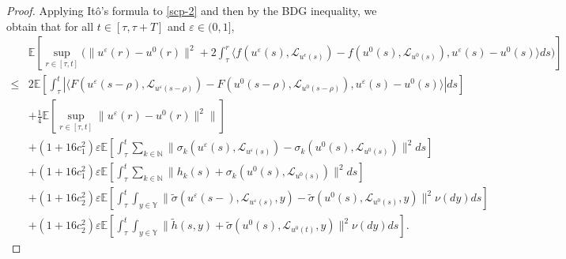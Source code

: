 \documentclass[11pt]{article}
\numberwithin{equation}{section}
\theoremstyle{plain}
\begin{document}
\begin{proof}
  Applying It\^o's formula to \eqref{scp-2} and then by the BDG inequality, we obtain that for all $t \in [\tau, \tau+T]$ and $\varepsilon \in (0,1]$,
  \begin{align}\label{scp-3}
         & \mathbb{E}
              \left[ \sup_{r \in [\tau, t]}
                        \bigg( \| u^\varepsilon(r) - u^0(r) \|^2 
                              +2 \int_{\tau}^{r}
                                   \langle f(u^\varepsilon(s), \mathcal{L}_{u^\epsilon(s)}) - f(u^{0}(s), \mathcal{L}_{u^{0}(s)}),
                                           u^\varepsilon(s) - u^{0}(s)
                                   \rangle ds
                        \bigg)
              \right]  \nonumber\\
   \le & 2 \mathbb{E}
               \left[ \int_{\tau}^{t}
                      \left| \langle F( u^\varepsilon(s-\rho), \mathcal{L}_{u^\varepsilon(s-\rho)}) - F( u^{0}(s-\rho), \mathcal{L}_{u^{0}(s-\rho)}),
                                     u^\varepsilon(s) - u^{0}(s)
                             \rangle
                       \right| ds
               \right]  \nonumber\\
        & + \frac{1}{4} \mathbb{E} \left[ \sup_{r \in [\tau, t]} \| u^\varepsilon(r) - u^0(r) \|^2 \| \right]  \nonumber\\
        & + (1+16c_1^2)\varepsilon \mathbb{E}
            \left[ \int_{\tau}^{t}
                      \sum_{k \in \mathbb{N} }
                            \|\sigma_k(u^\varepsilon(s), \mathcal{L}_{u^\varepsilon(s)}) - \sigma_k(u^{0}(s), \mathcal{L}_{u^{0}(s)}) \|^2 ds
            \right]  \nonumber\\
        & + (1+16c_1^2) \varepsilon \mathbb{E}
            \left[ \int_{\tau}^{t}
                      \sum_{k \in \mathbb{N} }
                            \| h_k(s) + \sigma_k(u^0(s), \mathcal{L}_{u^0(s)}) \|^2 ds
            \right]  \nonumber\\
        & + (1+16c_2^2)\varepsilon \mathbb{E}
            \left[ \int_{\tau}^{t}
                         \int_{y \in \mathbb{Y} }
                            \| \widetilde{\sigma}(u^\varepsilon(s-), \mathcal{L}_{u^\varepsilon(s)},y)
                              - \widetilde{\sigma}(u^{0}(s), \mathcal{L}_{u^{0}(s)},y) \|^2 \nu(dy) ds
            \right]  \nonumber\\
        & + (1+16c_2^2)\varepsilon \mathbb{E}
            \left[ \int_{\tau}^{t}
                         \int_{y \in \mathbb{Y} }
                            \| \widetilde{h}(s,y) 
                               + \widetilde{\sigma}(u^0(s), \mathcal{L}_{u^0(t)}, y) \|^2 \nu(dy) ds
            \right].
   \end{align}
 

\end{proof}
\end{document}
